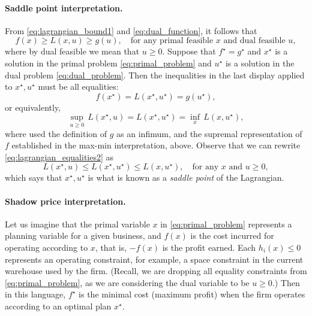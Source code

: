 \paragraph{Saddle point interpretation.}

From \eqref{eq:lagrangian_bound1} and \eqref{eq:dual_function}, it follows that  
\[
f(x) \geq L(x,u) \geq g(u), \quad \text{for any primal feasible $x$ and dual
  feasible $u$}, 
\]
where by dual feasible we mean that $u \geq 0$. Suppose that $f^\star =
g^\star$ and $x^\star$ is a solution in the primal problem
\eqref{eq:primal_problem} and $u^\star$ is a solution in the dual problem
\eqref{eq:dual_problem}. Then the inequalities in the last display applied to
$x^\star,u^\star$ must be all equalities:  
\begin{equation}
\label{eq:lagrangian_equalities1}
f(x^\star) = L(x^\star, u^\star) = g(u^\star),
\end{equation}
or equivalently, 
\begin{equation}
\label{eq:lagrangian_equalities2}
\sup_{u \geq 0} \, L(x^\star, u) = L(x^\star, u^\star) = \inf_x \, L(x,
u^\star), 
\end{equation}
where used the definition of $g$ as an infimum, and the supremal representation
of $f$ established in the max-min interpretation, above. Observe that we can
rewrite \eqref{eq:lagrangian_equalities2} as
\begin{equation}
\label{eq:lagrangian_saddle_point}
L(x^\star, u) \leq L(x^\star, u^\star) \leq L(x, u^\star), \quad \text{for any
  $x$ and $u \geq 0$},
\end{equation}
which says that $x^\star,u^\star$ is what is known as a \emph{saddle point} of 
the Lagrangian. 

\paragraph{Shadow price interpretation.}

Let us imagine that the primal variable $x$ in \eqref{eq:primal_problem}
represents a planning variable for a given business, and $f(x)$ is the cost 
incurred for operating according to $x$, that is, $-f(x)$ is the profit
earned. Each $h_i(x) \leq 0$ represents an operating constraint, for example, a
space constraint in the current warehouse used by the firm. (Recall, we are
dropping all equality constraints from \eqref{eq:primal_problem}, as we are  
considering the dual variable to be $u \geq 0$.)  Then in this language,
$f^\star$ is the minimal cost (maximum profit) when the firm operates according
to an optimal plan $x^\star$. 

